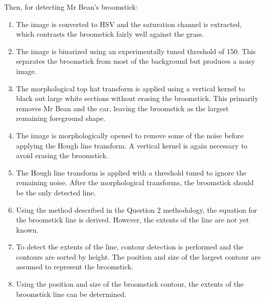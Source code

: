Then, for detecting Mr Bean's broomstick:
\begin{enumerate}
  \item The image is converted to HSV and the saturation channel is extracted, which contrasts the broomstick fairly well against the grass.

  \item The image is binarized using an experimentally tuned threshold of 150. This separates the broomstick from most of the background but produces a noisy image.

  \item The morphological top hat transform is applied using a vertical kernel to black out large white sections without erasing the broomstick. This primarily removes Mr Bean and the car, leaving the broomstick as the largest remaining foreground shape.

  \item The image is morphologically opened to remove some of the noise before applying the Hough line transform. A vertical kernel is again necessary to avoid erasing the broomstick.

  \item The Hough line transform is applied with a threshold tuned to ignore the remaining noise. After the morphological transforms, the broomstick should be the only detected line.

  \item Using the method described in the Question 2 methodology, the equation for the broomstick line is derived. However, the extents of the line are not yet known.

  \item To detect the extents of the line, contour detection is performed and the contours are sorted by height. The position and size of the largest contour are assumed to represent the broomstick.

  \item Using the position and size of the broomstick contour, the extents of the broomstick line can be determined.

\end{enumerate}

\newpage

